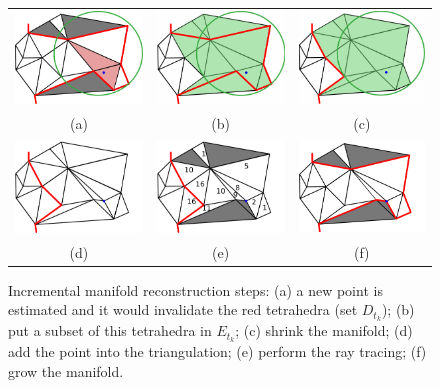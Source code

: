 \begin{figure}[tp]
\centering
 \begin{tabular}{ccc}
  \includegraphics[width=0.28\columnwidth]{./img/ch_soa/manifoldRec01}&
  \includegraphics[width=0.28\columnwidth]{./img/ch_soa/manifoldRec02}&
  \includegraphics[width=0.28\columnwidth]{./img/ch_soa/manifoldRec03}\\
  (a)&(b)&(c)\\
  \includegraphics[width=0.28\columnwidth]{./img/ch_soa/manifoldRec04}&
  \includegraphics[width=0.28\columnwidth]{./img/ch_soa/manifoldRec05}&
  \includegraphics[width=0.28\columnwidth]{./img/ch_soa/manifoldRec06}\\
  (d)&(e)&(f)\\
  
 \end{tabular}
 \caption{Incremental manifold reconstruction steps: (a) a new point is estimated and it would invalidate the red tetrahedra (set $D_{t_k}$); (b) put a subset of this tetrahedra in $E_{t_k}$; (c) shrink the manifold; (d) add the point into the triangulation; (e) perform the ray tracing; (f) grow the manifold.}
 \label{fig:manifoldreconstruction}
\end{figure}

